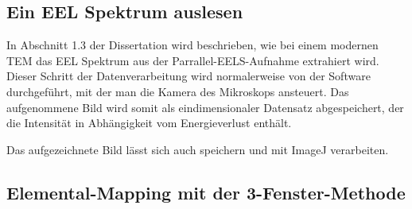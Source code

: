 \documentclass[
	paper=a4,				%
	twoside=true,			%
	BCOR=6mm,				%
	fontsize=12pt,			%
	pagesize=auto,			%
	numbers=noenddot,		%
	bibliography=totoc,		%
	draft=false
]{scrartcl}
\begin{document}
\subsection*{Ein EEL Spektrum auslesen}

In Abschnitt 1.3 der Dissertation wird beschrieben, wie bei einem modernen TEM das EEL Spektrum aus der Parrallel-EELS-Aufnahme extrahiert wird. Dieser Schritt der Datenverarbeitung wird normalerweise von der Software durchgeführt, mit der man die Kamera des Mikroskops ansteuert. Das aufgenommene Bild wird somit als eindimensionaler Datensatz abgespeichert, der die Intensität in Abhängigkeit vom Energieverlust enthält.

Das aufgezeichnete Bild lässt sich auch speichern und mit ImageJ verarbeiten. 


\subsection*{Elemental-Mapping mit der 3-Fenster-Methode}


\clearpage



\end{document}
